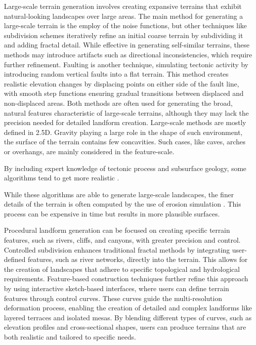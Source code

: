 Large-scale terrain generation involves creating expansive terrains that exhibit natural-looking landscapes over large areas. The main method for generating a large-scale terrain is the employ of the noise functions, but other techniques like subdivision schemes iteratively refine an initial coarse terrain by subdividing it and adding fractal detail. While effective in generating self-similar terrains, these methods may introduce artifacts such as directional inconsistencies, which require further refinement. Faulting is another technique, simulating tectonic activity by introducing random vertical faults into a flat terrain. This method creates realistic elevation changes by displacing points on either side of the fault line, with smooth step functions ensuring gradual transitions between displaced and non-displaced areas. Both methods are often used for generating the broad, natural features characteristic of large-scale terrains, although they may lack the precision needed for detailed landform creation. Large-scale methods are mostly defined in 2.5D. Gravity playing a large role in the shape of such environment, the surface of the terrain contains few concavities. Such cases, like caves, arches or overhangs, are mainly considered in the feature-scale.

By including expert knowledge of tectonic process and subsurface geology, some algorithms tend to get more realistic \cite{Patel2021, Cortial2019, Michel2016}. 

While these algorithms are able to generate large-scale landscapes, the finer details of the terrain is often computed by the use of erosion simulation \cite{Cordonnier2023, Schott2023, Paris2019b}. This process can be expensive in time but results in more plausible surfaces.

Procedural landform generation can be focused on creating specific terrain features, such as rivers, cliffs, and canyons, with greater precision and control. Controlled subdivision enhances traditional fractal methods by integrating user-defined features, such as river networks, directly into the terrain. This allows for the creation of landscapes that adhere to specific topological and hydrological requirements. Feature-based construction techniques further refine this approach by using interactive sketch-based interfaces, where users can define terrain features through control curves. These curves guide the multi-resolution deformation process, enabling the creation of detailed and complex landforms like layered terraces and isolated mesas. By blending different types of curves, such as elevation profiles and cross-sectional shapes, users can produce terrains that are both realistic and tailored to specific needs.

